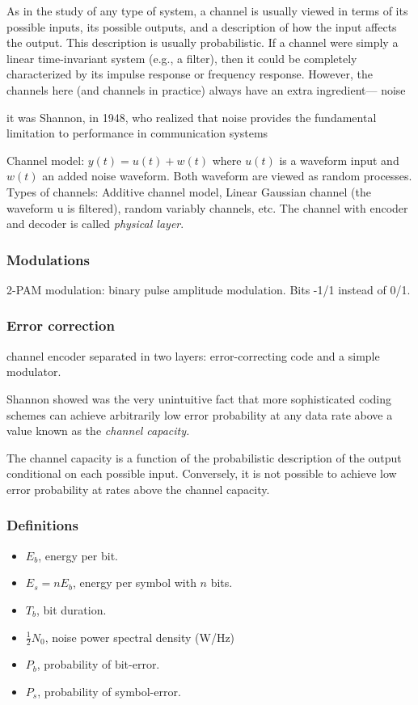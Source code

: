\documentclass[12pt,a4paper]{report}
\begin{document}
	As in the study of any type of system, a channel is usually viewed in terms of its possible inputs,
its possible outputs, and a description of how the input affects the output. This description is
usually probabilistic. If a channel were simply a linear time-invariant system (e.g., a filter), then
it could be completely characterized by its impulse response or frequency response. However,
the channels here (and channels in practice) always have an extra ingredient— noise


	it was Shannon, in 1948, who realized that noise provides
the fundamental limitation to performance in communication systems


	Channel model: $ y(t) = u(t) + w(t) $
	where $u(t)$ is a waveform input and $w(t)$ an added noise waveform. Both waveform are viewed as random processes.
	Types of channels: Additive channel model, Linear Gaussian channel (the waveform u is filtered), random variably channels, etc.
	The channel with encoder and decoder is called \textit{physical layer}.
	
	\subsubsection*{Modulations}
	
	2-PAM modulation: binary pulse amplitude modulation. Bits -1/1 instead of 0/1.
	
	\subsubsection{Error correction}
	
	channel encoder separated in two layers: error-correcting code and a simple modulator.
	
	Shannon showed was the very unintuitive fact that more sophisticated coding schemes can
achieve arbitrarily low error probability at any data rate above a value known as the \textit{channel capacity.}

	The channel capacity is a function of the probabilistic description of the output conditional on each possible input. Conversely, it is not possible to achieve low error probability at rates above the channel capacity.
	
	
	\subsubsection{Definitions}
	\begin{itemize}
	\item $E_{b}$, energy per bit.
	\item $E_{s}=nE_{b}$, energy per symbol with $n$ bits.
	\item $T_{b}$, bit duration.
	\item $\frac{1}{2}N_{0}$, noise power spectral density (W/Hz)
	\item $P_{b}$, probability of bit-error.
	\item $P_{s}$, probability of symbol-error.
	\end{itemize}
	
	
\end{document}
